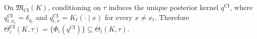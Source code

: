 On \(\mathfrak M_{\mathrm{CI}}(K)\), conditioning on \(\tau\) induces the unique posterior kernel \(q^{\mathrm{CI}}\), where \(q_{t,x_t}^{\mathrm{CI}}=\delta_{y_t}\) and \(q_{t,x}^{\mathrm{CI}}=K_t(\cdot\mid x)\) for every \(x\ne x_t\). Therefore \(\Theta_i^{\mathrm{CI}}(K,\tau)=\{\Phi_i(q^{\mathrm{CI}})\}\subseteq\Theta_i(K,\tau)\).